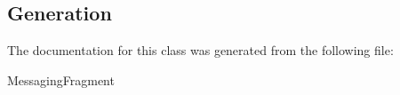 \subsection{Generation}
The documentation for this class was generated from the following file\-:
\begin{DoxyCompactItemize}
\item MessagingFragment
\end{DoxyCompactItemize} 









